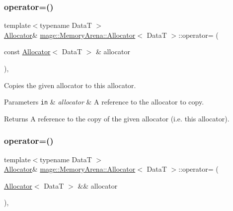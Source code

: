 \subsubsection{\texorpdfstring{operator=()}{operator=()}\hspace{0.1cm}{\footnotesize\ttfamily [1/2]}}
{\footnotesize\ttfamily template$<$typename DataT $>$ \\
\hyperlink{structmage_1_1_memory_arena_1_1_allocator}{Allocator}\& \hyperlink{structmage_1_1_memory_arena_1_1_allocator}{mage\+::\+Memory\+Arena\+::\+Allocator}$<$ DataT $>$\+::operator= (\begin{DoxyParamCaption}\item[{const \hyperlink{structmage_1_1_memory_arena_1_1_allocator}{Allocator}$<$ DataT $>$ \&}]{allocator }\end{DoxyParamCaption})\hspace{0.3cm}{\ttfamily [delete]}, {\ttfamily [noexcept]}}

Copies the given allocator to this allocator.


\begin{DoxyParams}[1]{Parameters}
\mbox{\tt in}  & {\em allocator} & A reference to the allocator to copy. \\
\hline
\end{DoxyParams}
\begin{DoxyReturn}{Returns}
A reference to the copy of the given allocator (i.\+e. this allocator). 
\end{DoxyReturn}
\hypertarget{structmage_1_1_memory_arena_1_1_allocator_af0e3639550c1b201abfac8f0e1a96acb}{}\label{structmage_1_1_memory_arena_1_1_allocator_af0e3639550c1b201abfac8f0e1a96acb} 
\subsubsection{\texorpdfstring{operator=()}{operator=()}\hspace{0.1cm}{\footnotesize\ttfamily [2/2]}}
{\footnotesize\ttfamily template$<$typename DataT $>$ \\
\hyperlink{structmage_1_1_memory_arena_1_1_allocator}{Allocator}\& \hyperlink{structmage_1_1_memory_arena_1_1_allocator}{mage\+::\+Memory\+Arena\+::\+Allocator}$<$ DataT $>$\+::operator= (\begin{DoxyParamCaption}\item[{\hyperlink{structmage_1_1_memory_arena_1_1_allocator}{Allocator}$<$ DataT $>$ \&\&}]{allocator }\end{DoxyParamCaption})\hspace{0.3cm}{\ttfamily [delete]}, {\ttfamily [noexcept]}}

